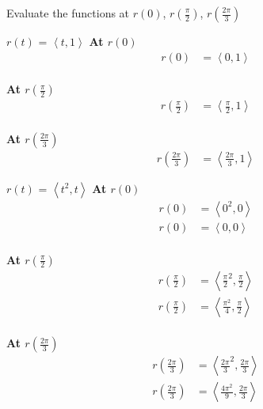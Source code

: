 \documentclass{article}
\begin{document}
\begin{example}{Evaluate the functions at $r(0)$, $r\left(\frac{\pi}{2}\right)$, $r\left(\frac{2\pi}{3}\right)$}

	\begin{subproblem}{$r(t)$ = $\left<t, 1\right>$}
		\textbf{At $r\left(0\right)$}
		\[\begin{split}
			r(0) &= \left<0, 1\right>
		\end{split}\] \\
		\textbf{At $r\left(\frac{\pi}{2}\right)$}
		\[
			\begin{split}
			r(\frac{\pi}{2}) &= \left<\frac{\pi}{2}, 1\right>
			\end{split}
		\] \\
		\textbf{At $r\left(\frac{2\pi}{3}\right)$}
		\[
			\begin{split}
			r(\frac{2\pi}{3}) &= \left<\frac{2\pi}{3}, 1\right>
			\end{split}
		\]
	\end{subproblem}

	\begin{subproblem}{$r(t)$ = $\left<t^2, t\right>$}
		\textbf{At $r\left(0\right)$}
		\[\begin{split}
			r(0) &= \left<0^2, 0\right> \\
			r(0) &= \left<0, 0\right>
		\end{split}\] \\
		\textbf{At $r\left(\frac{\pi}{2}\right)$}
		\[
			\begin{split}
			r(\frac{\pi}{2}) &= \left<\frac{\pi}{2}^2, \frac{\pi}{2}\right> \\
			r(\frac{\pi}{2}) &= \left<\frac{\pi^2}{4}, \frac{\pi}{2}\right>
			\end{split}
		\] \\
		\textbf{At $r\left(\frac{2\pi}{3}\right)$}
		\[
			\begin{split}
			r(\frac{2\pi}{3}) &= \left<\frac{2\pi}{3}^2, \frac{2\pi}{3}\right> \\
			r(\frac{2\pi}{3}) &= \left<\frac{4\pi^2}{9}, \frac{2\pi}{3}\right>
			\end{split}
		\]
	\end{subproblem}

\end{example}
\end{document}
